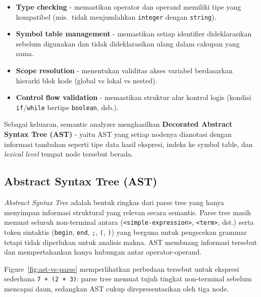 \documentclass[11pt,a4paper]{article}
\begin{document}
\begin{itemize}
    \item \textbf{Type checking} - memastikan operator dan operand memiliki
          tipe yang kompatibel (mis.\ tidak menjumlahkan \texttt{integer} dengan
          \texttt{string}).
    \item \textbf{Symbol table management} - memastikan setiap identifier
          dideklarasikan sebelum digunakan dan tidak dideklarasikan ulang dalam
          cakupan yang sama.
    \item \textbf{Scope resolution} - menentukan validitas akses variabel
          berdasarkan hierarki blok kode (global vs lokal vs nested).
    \item \textbf{Control flow validation} - memastikan struktur alur kontrol
          logis (kondisi \texttt{if}/\texttt{while} bertipe \texttt{boolean},
          dsb.).
\end{itemize}

Sebagai keluaran, semantic analyzer menghasilkan \textbf{Decorated Abstract
Syntax Tree (AST)} - yaitu AST yang setiap nodenya dianotasi dengan informasi
tambahan seperti tipe data hasil ekspresi, indeks ke symbol table, dan
\textit{lexical level} tempat node tersebut berada.

\subsection{Abstract Syntax Tree (AST)}

\textit{Abstract Syntax Tree} adalah bentuk ringkas dari parse tree yang hanya
menyimpan informasi struktural yang relevan secara semantis. Parse tree masih
memuat seluruh non-terminal antara (\texttt{<simple-expression>},
\texttt{<term>}, dst.) serta token sintaktis (\texttt{begin}, \texttt{end},
\texttt{;}, \texttt{(}, \texttt{)}) yang berguna untuk pengecekan grammar tetapi
tidak diperlukan untuk analisis makna. AST membuang informasi tersebut dan
mempertahankan hanya hubungan antar operator-operand.

Figure~\ref{fig:ast-vs-parse} memperlihatkan perbedaan tersebut untuk ekspresi
sederhana \texttt{7 + (2 + 3)}: parse tree memuat tujuh tingkat non-terminal
sebelum mencapai daun, sedangkan AST cukup direpresentasikan oleh tiga node.
\end{document}
